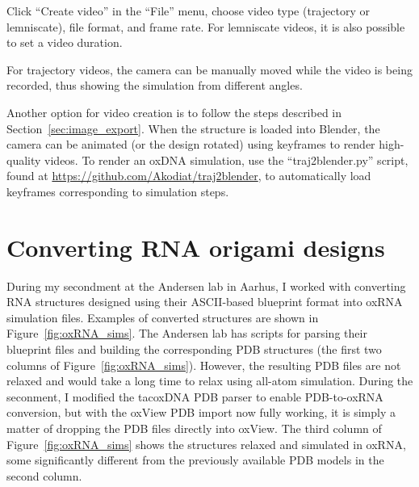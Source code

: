 Click ``Create video'' in the ``File'' menu, choose video type (trajectory or lemniscate), file format, and frame rate. For lemniscate videos, it is also possible to set a video duration.

For trajectory videos, the camera can be manually moved while the video is being recorded, thus showing the simulation from different angles.

Another option for video creation is to follow the steps described in Section~\ref{sec:image_export}. When the structure is loaded into Blender, the camera can be animated (or the design rotated) using keyframes to render high-quality videos. To render an oxDNA simulation, use the ``traj2blender.py'' script, found at \url{https://github.com/Akodiat/traj2blender}, to automatically load keyframes corresponding to simulation steps.

\section{Converting RNA origami designs}
\label{sec:converting_rna_origami}
During my secondment at the Andersen lab in Aarhus, I worked with converting RNA structures designed using their ASCII-based blueprint format into oxRNA simulation files. Examples of converted structures are shown in Figure~\ref{fig:oxRNA_sims}. The Andersen lab has scripts for parsing their blueprint files and building the corresponding PDB structures (the first two columns of Figure~\ref{fig:oxRNA_sims}). However, the resulting PDB files are not relaxed and would take a long time to relax using all-atom simulation. During the seconment, I modified the tacoxDNA \cite{suma2019tacoxdna} PDB parser to enable PDB-to-oxRNA conversion, but with the oxView PDB import now fully working, it is simply a matter of dropping the PDB files directly into oxView. The third column of Figure~\ref{fig:oxRNA_sims} shows the structures relaxed and simulated in oxRNA, some significantly different from the previously available PDB models in the second column.



